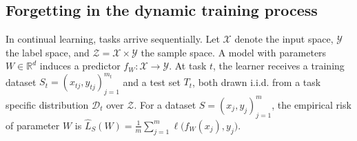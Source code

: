 \documentclass{article}
\begin{document}
\subsection{Forgetting in the dynamic training process}

In continual learning, tasks arrive sequentially.
Let $\mathcal{X}$ denote the input space, $\mathcal{Y}$ the label space, and $\mathcal{Z}=\mathcal{X}\times\mathcal{Y}$ the sample space.
A model with parameters $W\in\mathbb{R}^d$ induces a predictor $f_W:\mathcal{X}\rightarrow\mathcal{Y}$.
At task $t$, the learner receives a training dataset
$
S_t={(x_{tj},y_{tj})}_{j=1}^{m_t}
$
and a test set $T_t$, both drawn i.i.d. from a task specific distribution $\mathcal{D}_t$ over $\mathcal{Z}$.
For a dataset $S={(x_j,y_j)}_{j=1}^{m}$, the empirical risk of parameter $W$ is $\hat L_S(W)=
\frac{1}{m}
\sum_{j=1}^{m}
\ell\big(f_W(x_j),y_j\big).$
\end{document}
